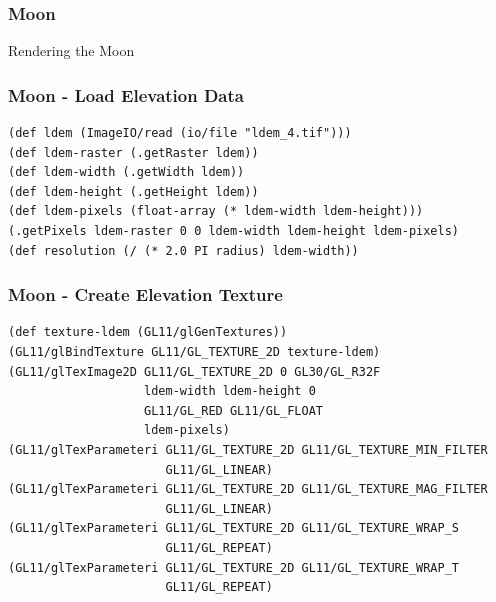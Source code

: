 \documentclass[aspectratio=169,11pt,xcolor=dvipsnames]{beamer}
\begin{document}
\begin{frame}
  \frametitle{Moon}
  \begin{center}
    \begin{huge}
      Rendering the Moon
    \end{huge}
  \end{center}
\end{frame}

\begin{frame}[fragile]
  \frametitle{Moon {-} Load Elevation Data}
  \begin{verbatim}
(def ldem (ImageIO/read (io/file "ldem_4.tif")))
(def ldem-raster (.getRaster ldem))
(def ldem-width (.getWidth ldem))
(def ldem-height (.getHeight ldem))
(def ldem-pixels (float-array (* ldem-width ldem-height)))
(.getPixels ldem-raster 0 0 ldem-width ldem-height ldem-pixels)
(def resolution (/ (* 2.0 PI radius) ldem-width))
  \end{verbatim}
\end{frame}

\begin{frame}[fragile]
  \frametitle{Moon {-} Create Elevation Texture}
  \begin{verbatim}
(def texture-ldem (GL11/glGenTextures))
(GL11/glBindTexture GL11/GL_TEXTURE_2D texture-ldem)
(GL11/glTexImage2D GL11/GL_TEXTURE_2D 0 GL30/GL_R32F
                   ldem-width ldem-height 0
                   GL11/GL_RED GL11/GL_FLOAT
                   ldem-pixels)
(GL11/glTexParameteri GL11/GL_TEXTURE_2D GL11/GL_TEXTURE_MIN_FILTER
                      GL11/GL_LINEAR)
(GL11/glTexParameteri GL11/GL_TEXTURE_2D GL11/GL_TEXTURE_MAG_FILTER
                      GL11/GL_LINEAR)
(GL11/glTexParameteri GL11/GL_TEXTURE_2D GL11/GL_TEXTURE_WRAP_S
                      GL11/GL_REPEAT)
(GL11/glTexParameteri GL11/GL_TEXTURE_2D GL11/GL_TEXTURE_WRAP_T
                      GL11/GL_REPEAT)
  \end{verbatim}
\end{frame}
\end{document}
